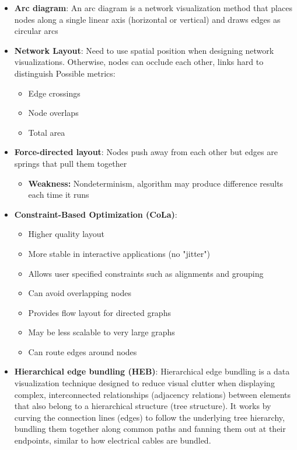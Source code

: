 \documentclass{report}
\begin{document}
\begin{itemize}
            \bigbreak \noindent 
            People tend to be more familiar with node-link diagrams. Link density is a problem with node-link but not with adjacency matrices
        \item \textbf{Arc diagram}: An arc diagram is a network visualization method that places nodes along a single linear axis (horizontal or vertical) and draws edges as circular arcs
            \bigbreak \noindent 
        \item \textbf{Network Layout}: Need to use spatial position when designing network visualizations. Otherwise, nodes can occlude each other, links hard to distinguish
            \bigbreak \noindent 
            Possible metrics:
            \begin{itemize}
                \item Edge crossings
                \item Node overlaps
                \item Total area
            \end{itemize}
        \item \textbf{Force-directed layout}: Nodes push away from each other but edges are springs that pull them together 
            \begin{itemize}
                \item \textbf{Weakness:} Nondeterminism, algorithm may produce difference results each time it runs
            \end{itemize}
        \item \textbf{Constraint-Based Optimization (CoLa)}: 
            \begin{itemize}
                \item Higher quality layout
                \item More stable in interactive applications (no "jitter")
                \item Allows user specified constraints such as alignments and grouping
                \item Can avoid overlapping nodes
                \item Provides flow layout for directed graphs
                \item May be less scalable to very large graphs
                \item Can route edges around nodes
            \end{itemize}
        \item \textbf{Hierarchical edge bundling (HEB)}: Hierarchical edge bundling is a data visualization technique designed to reduce visual clutter when displaying complex, interconnected relationships (adjacency relations) between elements that also belong to a hierarchical structure (tree structure). It works by curving the connection lines (edges) to follow the underlying tree hierarchy, bundling them together along common paths and fanning them out at their endpoints, similar to how electrical cables are bundled.




    \end{itemize}
\end{document}
